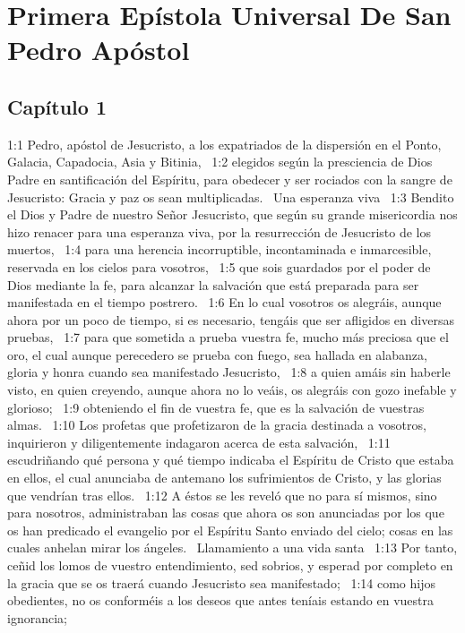 \chapter{Primera Epístola Universal De San Pedro Apóstol}


\section*{Capítulo 1 }
1:1 Pedro, apóstol de Jesucristo, a los expatriados de la dispersión en el Ponto, Galacia, Capadocia, Asia y Bitinia,  
1:2 elegidos según la presciencia de Dios Padre en santificación del Espíritu, para obedecer y ser rociados con la sangre de Jesucristo: Gracia y paz os sean multiplicadas.  
Una esperanza viva  
1:3 Bendito el Dios y Padre de nuestro Señor Jesucristo, que según su grande misericordia nos hizo renacer para una esperanza viva, por la resurrección de Jesucristo de los muertos,  
1:4 para una herencia incorruptible, incontaminada e inmarcesible, reservada en los cielos para vosotros,  
1:5 que sois guardados por el poder de Dios mediante la fe, para alcanzar la salvación que está preparada para ser manifestada en el tiempo postrero.  
1:6 En lo cual vosotros os alegráis, aunque ahora por un poco de tiempo, si es necesario, tengáis que ser afligidos en diversas pruebas,  
1:7 para que sometida a prueba vuestra fe, mucho más preciosa que el oro, el cual aunque perecedero se prueba con fuego, sea hallada en alabanza, gloria y honra cuando sea manifestado Jesucristo,  
1:8 a quien amáis sin haberle visto, en quien creyendo, aunque ahora no lo veáis, os alegráis con gozo inefable y glorioso;  
1:9 obteniendo el fin de vuestra fe, que es la salvación de vuestras almas.  
1:10 Los profetas que profetizaron de la gracia destinada a vosotros, inquirieron y diligentemente indagaron acerca de esta salvación,  
1:11 escudriñando qué persona y qué tiempo indicaba el Espíritu de Cristo que estaba en ellos, el cual anunciaba de antemano los sufrimientos de Cristo, y las glorias que vendrían tras ellos.  
1:12 A éstos se les reveló que no para sí mismos, sino para nosotros, administraban las cosas que ahora os son anunciadas por los que os han predicado el evangelio por el Espíritu Santo enviado del cielo; cosas en las cuales anhelan mirar los ángeles.  
Llamamiento a una vida santa  
1:13 Por tanto, ceñid los lomos de vuestro entendimiento, sed sobrios, y esperad por completo en la gracia que se os traerá cuando Jesucristo sea manifestado;  
1:14 como hijos obedientes, no os conforméis a los deseos que antes teníais estando en vuestra ignorancia;  
